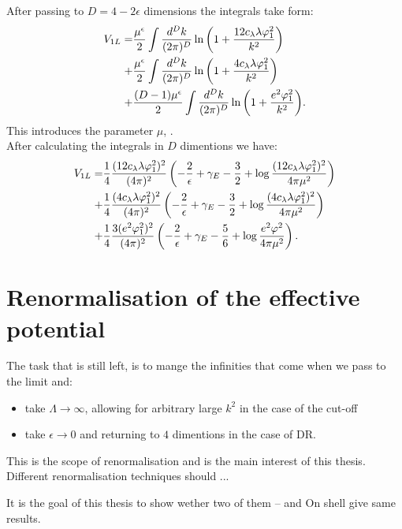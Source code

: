 After passing to $D=4-2\epsilon$ dimensions the integrals take form: 
\begin{align}
V_{1L}=&\frac{\mu^\epsilon}{2} \int\frac{d^Dk}{(2\pi)^D}\ln{\left(1+\frac{12c_\lambda\lambda\varphi_1^2}{k^2}
\right)}\\
+&\frac{\mu^\epsilon}{2} \int\frac{d^Dk}{(2\pi)^D}\ln{\left(1+\frac{4c_\lambda\lambda\varphi_1^2}{k^2}
\right)} \\ 
+&\frac{(D-1)\mu^\epsilon}{2} \int\frac{d^Dk}{(2\pi)^D}\ln{\left(1+\frac{e^2\varphi_1^2}{k^2}\right)}.
\end{align}
This introduces the parameter $\mu$, . \\

After calculating the integrals in $D$ dimentions we have:
\begin{align}
V_{1L}=&\frac{1}{4}\frac{(12c_\lambda\lambda\varphi_1^2)^2}{(4\pi)^2}\left(-\frac{2}{\epsilon}
+\gamma_E-\frac{3}{2}+\log{\frac{(12c_\lambda\lambda\varphi_1^2)^2}{4\pi\mu^2}}\right)  \\
+&\frac{1}{4}\frac{(4c_\lambda\lambda\varphi_1^2)^2}{(4\pi)^2}\left(-\frac{2}{\epsilon}
+\gamma_E-\frac{3}{2}+\log{\frac{(4c_\lambda\lambda\varphi_1^2)^2}{4\pi\mu^2}}\right)  \\
+&\frac{1}{4}\frac{3(e^2\varphi_1^2)^2}{(4\pi)^2}\left(-\frac{2}{\epsilon}+\gamma_E
-\frac{5}{6}+\log{\frac{e^2\varphi^2}{4\pi\mu^2}}\right).
\end{align}


\section{Renormalisation of the effective potential}
The task that is still left, is to mange the infinities that come when we pass to the limit 
and:
\begin{itemize} 
\item take $\Lambda \to \infty$, allowing for arbitrary large $k^2$ in the case of the cut-off
\item take $\epsilon \to 0$ and returning to $4$ dimentions in the case of DR.

\end{itemize}
This is the scope of renormalisation and is the main interest of this thesis. 
Different renormalisation techniques should ... 

It is the goal of this thesis to show wether two of them -- \MSbar and On shell give same results.



